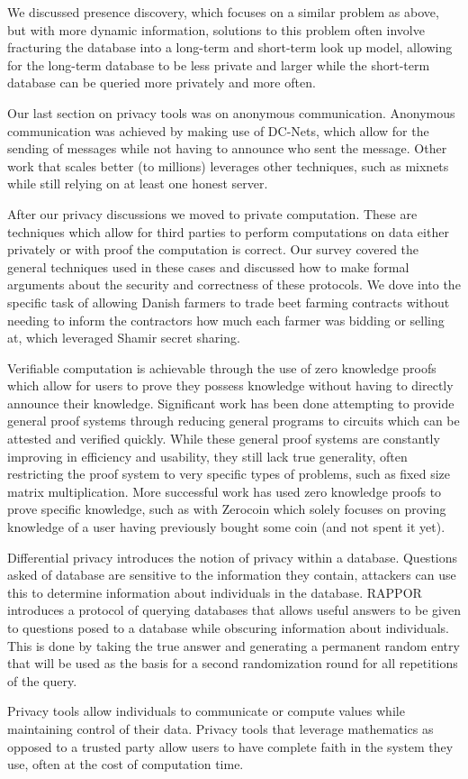 We discussed presence discovery, which focuses on a similar problem as
above, but with more dynamic information, solutions to this problem often
involve fracturing the database into a long-term and short-term look up model,
allowing for the long-term database to be less private and larger while the
short-term database can be queried more privately and more often.

Our last section on privacy tools was on anonymous communication. Anonymous
communication was achieved by making use of DC-Nets, which allow for the sending
of messages while not having to announce who sent the message. Other work that
scales better (to millions) leverages other techniques, such as mixnets while
still relying on at least one honest server.

After our privacy discussions we moved to private computation. These are
techniques which allow for third parties to perform computations on data either
privately or with proof the computation is correct. Our survey covered the
general techniques used in these cases and discussed how to make formal
arguments about the security and correctness of these protocols. We dove into
the specific task of allowing Danish farmers to trade beet farming contracts
without needing to inform the contractors how much each farmer was bidding or
selling at, which leveraged Shamir secret sharing.

Verifiable computation is achievable through the use of zero knowledge proofs
which allow for users to prove they possess knowledge without having to directly
announce their knowledge. Significant work has been done attempting to provide
general proof systems through reducing general programs to circuits which can be
attested and verified quickly. While these general proof systems are constantly
improving in efficiency and usability, they still lack true generality, often
restricting the proof system to very specific types of problems, such as fixed
size matrix multiplication. More successful work has used zero knowledge proofs
to prove specific knowledge, such as with Zerocoin which solely focuses on
proving knowledge of a user having previously bought some coin (and not spent it
yet).

Differential privacy introduces the notion of privacy within a database.
Questions asked of database are sensitive to the information they contain,
attackers can use this to determine information about individuals in the
database. RAPPOR introduces a protocol of querying databases that allows useful
answers to be given to questions posed to a database while obscuring information
about individuals. This is done by taking the true answer and generating a
permanent random entry that will be used as the basis for a second randomization
round for all repetitions of the query.

Privacy tools allow individuals to communicate or compute values while
maintaining control of their data. Privacy tools that leverage mathematics as
opposed to a trusted party allow users to have complete faith in the system they
use, often at the cost of computation time.